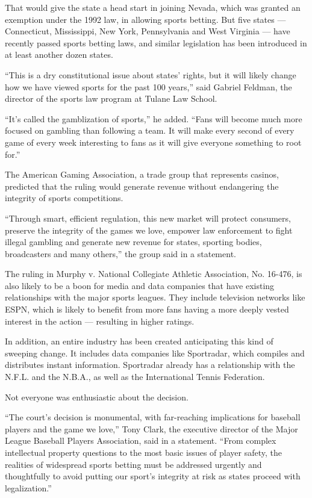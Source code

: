 That would give the state a head start in joining Nevada, which was
granted an exemption under the 1992 law, in allowing sports betting. But
five states --- Connecticut, Mississippi, New York, Pennsylvania and
West Virginia --- have recently passed sports betting laws, and similar
legislation has been introduced in at least another dozen states.

``This is a dry constitutional issue about states' rights, but it will
likely change how we have viewed sports for the past 100 years,'' said
Gabriel Feldman, the director of the sports law program at Tulane Law
School.

``It's called the gamblization of sports,'' he added. ``Fans will become
much more focused on gambling than following a team. It will make every
second of every game of every week interesting to fans as it will give
everyone something to root for.''

The American Gaming Association, a trade group that represents casinos,
predicted that the ruling would generate revenue without endangering the
integrity of sports competitions.

``Through smart, efficient regulation, this new market will protect
consumers, preserve the integrity of the games we love, empower law
enforcement to fight illegal gambling and generate new revenue for
states, sporting bodies, broadcasters and many others,'' the group said
in a statement.

The ruling in Murphy v. National Collegiate Athletic Association, No.
16-476, is also likely to be a boon for media and data companies that
have existing relationships with the major sports leagues. They include
television networks like ESPN, which is likely to benefit from more fans
having a more deeply vested interest in the action --- resulting in
higher ratings.

In addition, an entire industry has been created anticipating this kind
of sweeping change. It includes data companies like Sportradar, which
compiles and distributes instant information. Sportradar already has a
relationship with the N.F.L. and the N.B.A., as well as the
International Tennis Federation.

Not everyone was enthusiastic about the decision.

``The court's decision is monumental, with far-reaching implications for
baseball players and the game we love,'' Tony Clark, the executive
director of the Major League Baseball Players Association, said in a
statement. ``From complex intellectual property questions to the most
basic issues of player safety, the realities of widespread sports
betting must be addressed urgently and thoughtfully to avoid putting our
sport's integrity at risk as states proceed with legalization.''

